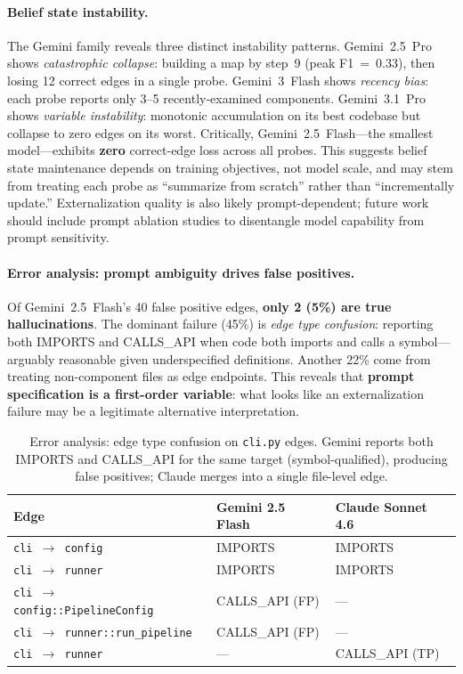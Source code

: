 \documentclass{article}
\begin{document}
\paragraph{Belief state instability.}
The Gemini family reveals three distinct instability patterns. Gemini~2.5~Pro shows \emph{catastrophic collapse}: building a map by step~9 (peak F1~=~0.33), then losing 12 correct edges in a single probe. Gemini~3~Flash shows \emph{recency bias}: each probe reports only 3--5 recently-examined components. Gemini~3.1~Pro shows \emph{variable instability}: monotonic accumulation on its best codebase but collapse to zero edges on its worst. Critically, Gemini~2.5~Flash---the smallest model---exhibits \textbf{zero} correct-edge loss across all probes. This suggests belief state maintenance depends on training objectives, not model scale, and may stem from treating each probe as ``summarize from scratch'' rather than ``incrementally update.'' Externalization quality is also likely prompt-dependent; future work should include prompt ablation studies to disentangle model capability from prompt sensitivity.

\paragraph{Error analysis: prompt ambiguity drives false positives.}
Of Gemini~2.5~Flash's 40 false positive edges, \textbf{only 2 (5\%) are true hallucinations}. The dominant failure (45\%) is \emph{edge type confusion}: reporting both IMPORTS and CALLS\_API when code both imports and calls a symbol---arguably reasonable given underspecified definitions. Another 22\% come from treating non-component files as edge endpoints. This reveals that \textbf{prompt specification is a first-order variable}: what looks like an externalization failure may be a legitimate alternative interpretation.

\begin{table}[h]
\centering
\caption{Error analysis: edge type confusion on \texttt{cli.py} edges. Gemini reports both IMPORTS and CALLS\_API for the same target (symbol-qualified), producing false positives; Claude merges into a single file-level edge.}
\label{tab:error_analysis}
\small
\begin{tabular}{@{}lll@{}}
\toprule
\textbf{Edge} & \textbf{Gemini 2.5 Flash} & \textbf{Claude Sonnet 4.6} \\
\midrule
\texttt{cli $\to$ config} & IMPORTS & IMPORTS \\
\texttt{cli $\to$ runner} & IMPORTS & IMPORTS \\
\texttt{cli $\to$ config::PipelineConfig} & CALLS\_API {\color{red}(FP)} & --- \\
\texttt{cli $\to$ runner::run\_pipeline} & CALLS\_API {\color{red}(FP)} & --- \\
\texttt{cli $\to$ runner} & --- & CALLS\_API {\color{green!50!black}(TP)} \\
\bottomrule
\end{tabular}
\end{table}
\end{document}
